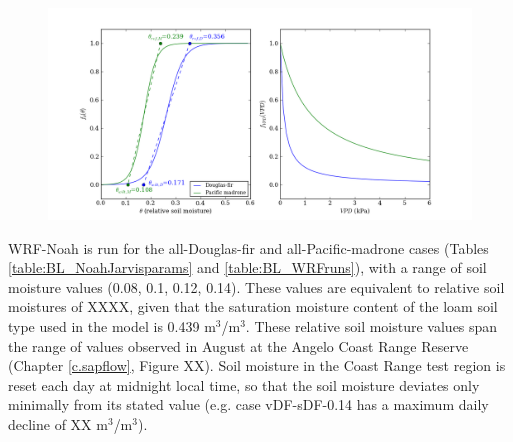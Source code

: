 \begin{figure}[here]
\includegraphics[width=1\textwidth]{ch2-BL/figures/theta_params.png}
\caption{}
\label{fig:BL_FeddesParams}
\end{figure}


WRF-Noah is run for the all-Douglas-fir and all-Pacific-madrone cases (Tables \ref{table:BL_NoahJarvisparams} and \ref{table:BL_WRFruns}), with a range of soil moisture values (0.08, 0.1, 0.12, 0.14).  These values are equivalent to relative soil moistures of XXXX, given that the saturation moisture content of the loam soil type used in the model is 0.439 m$^3$/m$^3$.  These relative soil moisture values span the range of values observed in August at the Angelo Coast Range Reserve (Chapter \ref{c.sapflow}, Figure XX).  Soil moisture in the Coast Range test region is reset each day at midnight local time, so that the soil moisture deviates only minimally from its stated value (e.g. case vDF-sDF-0.14 has a maximum daily decline of XX m$^3$/m$^3$).
